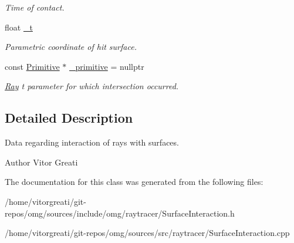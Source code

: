 \begin{DoxyCompactItemize}
\begin{DoxyCompactList}\small\item\em Time of contact. \end{DoxyCompactList}\item 
\mbox{\label{classomg_1_1_surface_interaction_a89650a01634a796109ef76c01aaa59b7}} 
float \mbox{\hyperlink{classomg_1_1_surface_interaction_a89650a01634a796109ef76c01aaa59b7}{\+\_\+t}}
\begin{DoxyCompactList}\small\item\em Parametric coordinate of hit surface. \end{DoxyCompactList}\item 
\mbox{\label{classomg_1_1_surface_interaction_af18f32eaed705c2d4d693a1f362dd63f}} 
const \mbox{\hyperlink{classomg_1_1_primitive}{Primitive}} $\ast$ \mbox{\hyperlink{classomg_1_1_surface_interaction_af18f32eaed705c2d4d693a1f362dd63f}{\+\_\+primitive}} = nullptr
\begin{DoxyCompactList}\small\item\em \mbox{\hyperlink{classomg_1_1_ray}{Ray}} t parameter for which intersection occurred. \end{DoxyCompactList}\end{DoxyCompactItemize}


\subsection{Detailed Description}
Data regarding interaction of rays with surfaces. 

\begin{DoxyAuthor}{Author}
Vitor Greati 
\end{DoxyAuthor}


The documentation for this class was generated from the following files\+:\begin{DoxyCompactItemize}
\item 
/home/vitorgreati/git-\/repos/omg/sources/include/omg/raytracer/Surface\+Interaction.\+h\item 
/home/vitorgreati/git-\/repos/omg/sources/src/raytracer/Surface\+Interaction.\+cpp\end{DoxyCompactItemize}
